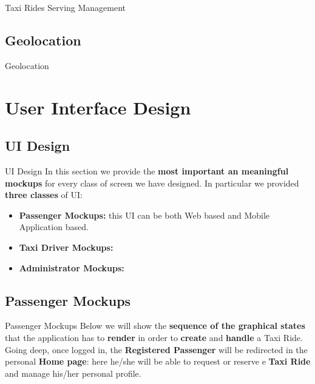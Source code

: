 \documentclass{../common/latex_classes/pdf_presentation}
\newcommand{\itemBold}[1]{\item\textbf{#1:}}
\begin{document}
	\begin{frame}{Taxi Rides Serving Management}
	\end{frame}
	
	\subsection{Geolocation}
	
	\begin{frame}{Geolocation}
	\end{frame}
	
	\section{User Interface Design}
	
	\subsection{UI Design}
	
	\begin{frame}{UI Design}
		In this section we provide the \textbf{most important an meaningful mockups} for every class of screen we have designed.
		In particular we provided \textbf{three classes} of UI:
		\begin{itemize}
			\itemBold {Passenger Mockups} this UI can be both Web based and Mobile Application based.
			\itemBold {Taxi Driver Mockups}
			\itemBold {Administrator Mockups}
		\end{itemize}
	\end{frame}
	
	\subsection{Passenger Mockups}
	
	\begin{frame}{Passenger Mockups}
		Below we will show the \textbf{sequence of the graphical states} that the application has to \textbf{render} in order to \textbf{create} and \textbf{handle} a Taxi Ride.
		Going deep, once logged in, the \textbf{Registered Passenger} will be redirected in the personal \textbf{Home page}: here he/she will be able to request or reserve e \textbf{Taxi Ride} and manage his/her personal profile.
	\end{frame}
	
\end{document}
